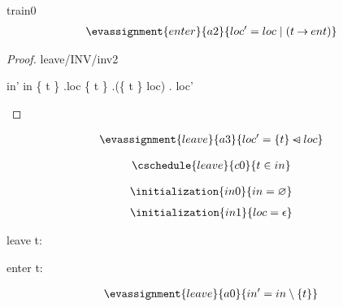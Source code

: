 \documentclass[12pt]{amsart}
\begin{document}
\begin{machine}{train0}
\begin{align*}
\evassignment{enter}{a2}
{	loc' = loc  \1| (t \tfun ent)	}
\end{align*}

\begin{proof}{leave/INV/inv2}
	\begin{calculation}
		in'
	\hint{=}{ \ref{a0} }
		in \setminus \{ t \}
	\hint{=}{ \ref{inv2} }
		\dom.loc \setminus \{ t \}
		\dom.(\{ t \} \domsub loc)
	\hint{=}{ \ref{a3} } 
		\dom. loc' 
	\end{calculation}
\end{proof}

\begin{align*}
\evassignment{leave}{a3}
{	loc' = \{ t \} \domsub loc 	}
\end{align*}

\begin{align*}
\cschedule{leave}{c0}
{	t \in in}
\end{align*}

\begin{align*}
\initialization{in0}
{	in = \emptyset	}
\end{align*}
\begin{align*}
\initialization{in1}
{	loc = \emptyfun	}
\end{align*}

\begin{use:set}{\TRAIN} \end{use:set}
\begin{use:set}{\LOC} \end{use:set}
\begin{use:set}{\BLK} \end{use:set}
\begin{use:fun}{\TRAIN}{\BLK} \end{use:fun}

\begin{indices}{leave}
	t: \TRAIN
\end{indices}

\begin{indices}{enter}
	t: \TRAIN
\end{indices}

\begin{align*}
\evassignment{leave}{a0}
{	in' = in \setminus \{ t \}	}
\end{align*}


\end{machine}
\end{document}
